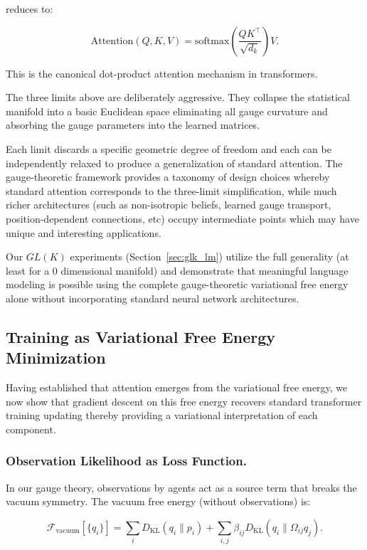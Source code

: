 \documentclass[twoside,11pt]{article}
\begin{document}
reduces to:

\begin{equation}
\boxed{\mathrm{Attention}(Q,K,V) = \mathrm{softmax}\left(\frac{QK^\top}{\sqrt{d_k}}\right)V}.
\end{equation}

This is the canonical dot-product attention mechanism in transformers.

The three limits above are deliberately aggressive.  They collapse the statistical manifold into a basic Euclidean space eliminating all gauge curvature and absorbing the gauge parameters into the learned matrices. 

Each limit discards a specific geometric degree of freedom and each can be independently relaxed to produce a generalization of standard attention. The gauge-theoretic framework provides a taxonomy of design choices whereby standard attention corresponds to the three-limit simplification, while much richer architectures (such as non-isotropic beliefs, learned gauge transport, position-dependent connections, etc) occupy intermediate points which may have unique and interesting applications. 

Our $GL(K)$ experiments (Section~\ref{sec:glk_lm}) utilize the full generality (at least for a $0$ dimensional manifold) and demonstrate that meaningful language modeling is possible using the complete gauge-theoretic variational free energy alone without incorporating standard neural network architectures.

\subsection{Training as Variational Free Energy Minimization}

Having established that attention emerges from the variational free energy, we now show that gradient descent on this free energy recovers  standard transformer training updating thereby providing a variational interpretation of each component.

\subsubsection{Observation Likelihood as Loss Function.}

In our gauge theory, observations by agents act as a source term that breaks the vacuum symmetry. The vacuum free energy (without observations) is:

\begin{equation}
\mathcal{F}_{\text{vacuum}}[\{q_i\}] = \sum_i D_{\mathrm{KL}}(q_i \| p_i) + \sum_{i,j} \beta_{ij} D_{\mathrm{KL}}(q_i \| \Omega_{ij} q_j).
\end{equation}
\end{document}
